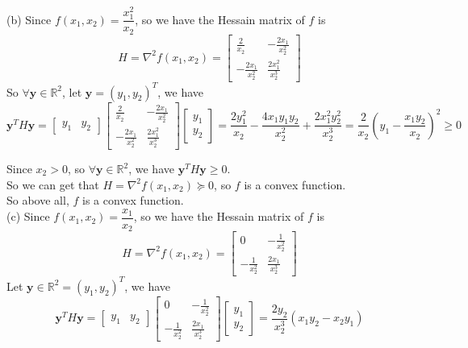 \documentclass[10pt]{article}
\begin{document}
\begin{enumerate}[1.]
		  (b) Since $f(x_1,x_2)=\dfrac{x_1^2}{x_2}$, so we have the Hessain matrix of $f$ is
		  $$H=\nabla^2f(x_1,x_2)=
		  \begin{bmatrix}
		  \frac{2}{x_2} & -\frac{2x_1}{x_2^2}\\
		  -\frac{2x_1}{x_2^2} & \frac{2x_1^2}{x_2^3}
	      \end{bmatrix}$$
		  So $\forall\mathbf{y}\in\mathbb{R}^2$, let $\mathbf{y}=(y_1,y_2)^T$, we have
		  $$\mathbf{y}^TH\mathbf{y}=\begin{bmatrix}
		  y_1 & y_2\end{bmatrix}
	  	  \begin{bmatrix}\frac{2}{x_2} & -\frac{2x_1}{x_2^2}\\
	  	  -\frac{2x_1}{x_2^2} & \frac{2x_1^2}{x_2^3}\end{bmatrix}
		  \begin{bmatrix}y_1\\y_2\end{bmatrix}
		  =\frac{2y_1^2}{x_2}-\frac{4x_1y_1y_2}{x_2^2}+\frac{2x_1^2y_2^2}{x_2^3}=\dfrac{2}{x_2}\left(y_1-\dfrac{x_1y_2}{x_2}\right)^2\geq 0$$

		  Since $x_2 > 0$, so $\forall\mathbf{y}\in\mathbb{R}^2$, we have $\mathbf{y}^TH\mathbf{y}\geq 0$.\\
		  So we can get that $H=\nabla^2f(x_1,x_2)\succeq 0$, so $f$ is a convex function.\\

		  So above all, $f$ is a convex function.\\

		  (c) Since $f(x_1,x_2)=\dfrac{x_1}{x_2}$, so we have the Hessain matrix of $f$ is
		  $$H=\nabla^2f(x_1,x_2)=
		  \begin{bmatrix}
		  0 & -\frac{1}{x_2^2}\\
		  -\frac{1}{x_2^2} & \frac{2x_1}{x_2^3}
	      \end{bmatrix}$$
		  Let $\mathbf{y}\in\mathbb{R}^2=(y_1,y_2)^T$, we have
		  $$\mathbf{y}^TH\mathbf{y}=\begin{bmatrix}
		  y_1 & y_2\end{bmatrix}
		  \begin{bmatrix}0 & -\frac{1}{x_2^2}\\
		  -\frac{1}{x_2^2} & \frac{2x_1}{x_2^3}\end{bmatrix}
		  \begin{bmatrix}y_1\\y_2\end{bmatrix}
		  =\dfrac{2y_2}{x_2^3}(x_1y_2-x_2y_1)$$
		  

\end{enumerate}
\end{document}
